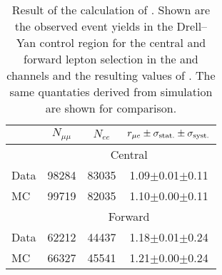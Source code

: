 
\begin{table}[hbtp]
 \renewcommand{\arraystretch}{1.3}
 \setlength{\belowcaptionskip}{6pt}
 \centering
 \caption{Result of the calculation of \rmue. Shown are the observed event yields in the Drell--Yan control region for the central and forward lepton selection in the \EE and \MM channels and the resulting values of 
\rmue. The same quantaties derived from simulation are shown for comparison.}
  \label{tab:rMuE}
  \begin{tabular}{l| ccc }

    							& $N_{\mu\mu}$ &  $N_{ee}$ & $r_{\mu e} \pm \sigma_{\text{stat.}} \pm \sigma_{\text{syst.}}$ \\ 
    
    \hline
    							& \multicolumn{3}{c}{Central}  \\ 

    \hline
        Data       &  98284                   & 83035              &  1.09$\pm$0.01$\pm$0.11    \\

        MC       &  99719                   & 82035              &  1.10$\pm$0.00$\pm$0.11    \\

\hline
    							& \multicolumn{3}{c}{Forward}  \\ 

    \hline
        Data       &  62212                   & 44437              &  1.18$\pm$0.01$\pm$0.24    \\

        MC       &  66327                   & 45541              &  1.21$\pm$0.00$\pm$0.24    \\

  \end{tabular}
\end{table}


